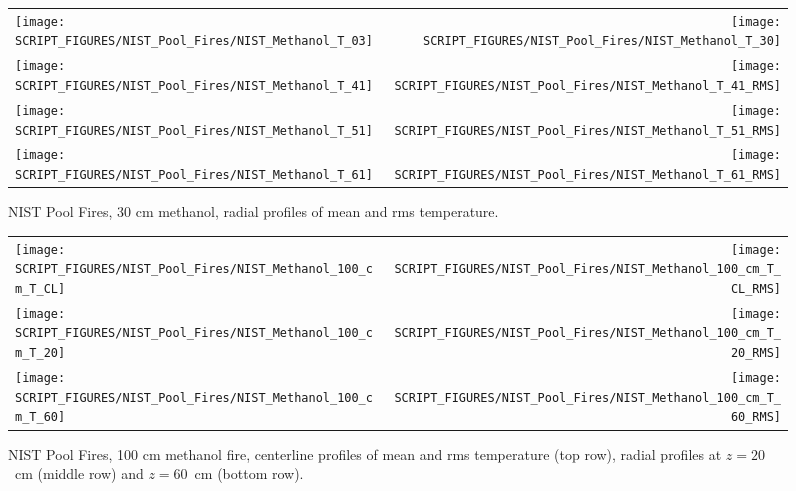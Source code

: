 \begin{figure}[p]
\begin{tabular*}{\textwidth}{l@{\extracolsep{\fill}}r}
\texttt{[image: SCRIPT\_FIGURES/NIST\_Pool\_Fires/NIST\_Methanol\_T\_03]} &
\texttt{[image: SCRIPT\_FIGURES/NIST\_Pool\_Fires/NIST\_Methanol\_T\_30]} \\
\texttt{[image: SCRIPT\_FIGURES/NIST\_Pool\_Fires/NIST\_Methanol\_T\_41]} &
\texttt{[image: SCRIPT\_FIGURES/NIST\_Pool\_Fires/NIST\_Methanol\_T\_41\_RMS]} \\
\texttt{[image: SCRIPT\_FIGURES/NIST\_Pool\_Fires/NIST\_Methanol\_T\_51]} &
\texttt{[image: SCRIPT\_FIGURES/NIST\_Pool\_Fires/NIST\_Methanol\_T\_51\_RMS]} \\
\texttt{[image: SCRIPT\_FIGURES/NIST\_Pool\_Fires/NIST\_Methanol\_T\_61]} &
\texttt{[image: SCRIPT\_FIGURES/NIST\_Pool\_Fires/NIST\_Methanol\_T\_61\_RMS]}
\end{tabular*}
\caption[NIST Pool Fires, 30 cm methanol, radial profiles of mean and rms temperature]
{NIST Pool Fires, 30 cm methanol, radial profiles of mean and rms temperature.}
\label{NIST_Pool_Fires_Temperature_3}
\end{figure}


\begin{figure}[p]
\begin{tabular*}{\textwidth}{l@{\extracolsep{\fill}}r}
\texttt{[image: SCRIPT\_FIGURES/NIST\_Pool\_Fires/NIST\_Methanol\_100\_cm\_T\_CL]} &
\texttt{[image: SCRIPT\_FIGURES/NIST\_Pool\_Fires/NIST\_Methanol\_100\_cm\_T\_CL\_RMS]} \\
\texttt{[image: SCRIPT\_FIGURES/NIST\_Pool\_Fires/NIST\_Methanol\_100\_cm\_T\_20]} &
\texttt{[image: SCRIPT\_FIGURES/NIST\_Pool\_Fires/NIST\_Methanol\_100\_cm\_T\_20\_RMS]} \\
\texttt{[image: SCRIPT\_FIGURES/NIST\_Pool\_Fires/NIST\_Methanol\_100\_cm\_T\_60]} &
\texttt{[image: SCRIPT\_FIGURES/NIST\_Pool\_Fires/NIST\_Methanol\_100\_cm\_T\_60\_RMS]}
\end{tabular*}
\caption[NIST Pool Fires, 100 cm methanol, plume mean and rms temperatures]
{NIST Pool Fires, 100 cm methanol fire, centerline profiles of mean and rms temperature (top row), radial profiles at $z=20$~cm (middle row) and $z=60$~cm (bottom row).}
\label{NIST_Pool_Fires_Plume_Temps_1}
\end{figure}

